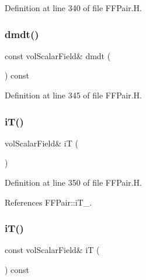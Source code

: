 Definition at line 340 of file F\+F\+Pair.\+H.

\mbox{\label{classFoam_1_1FFPair_a918f3d5a64d7cf4215c6429757e28486}} 
\subsubsection{\texorpdfstring{dmdt()}{dmdt()}}
{\footnotesize\ttfamily const vol\+Scalar\+Field\& dmdt (\begin{DoxyParamCaption}{ }\end{DoxyParamCaption}) const\hspace{0.3cm}{\ttfamily [inline]}}



Definition at line 345 of file F\+F\+Pair.\+H.

\mbox{\label{classFoam_1_1FFPair_a8615a86198b86e1fe02839ec37e58791}} 
\subsubsection{\texorpdfstring{i\+T()}{iT()}\hspace{0.1cm}{\footnotesize\ttfamily [1/2]}}
{\footnotesize\ttfamily vol\+Scalar\+Field\& iT (\begin{DoxyParamCaption}{ }\end{DoxyParamCaption})\hspace{0.3cm}{\ttfamily [inline]}}



Definition at line 350 of file F\+F\+Pair.\+H.



References F\+F\+Pair\+::i\+T\+\_\+.

\mbox{\label{classFoam_1_1FFPair_a3a9f983828f0c3a7e72305f182a741f0}} 
\subsubsection{\texorpdfstring{i\+T()}{iT()}\hspace{0.1cm}{\footnotesize\ttfamily [2/2]}}
{\footnotesize\ttfamily const vol\+Scalar\+Field\& iT (\begin{DoxyParamCaption}{ }\end{DoxyParamCaption}) const\hspace{0.3cm}{\ttfamily [inline]}}



